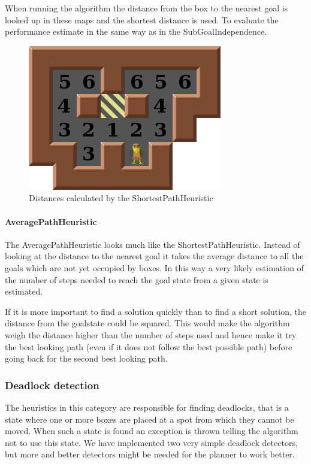 When running the algorithm the distance from the box to the nearest
goal is looked up in these maps and the shortest distance is used. To
evaluate the performance estimate in the same way as in the
SubGoalIndependence.
\begin{figure}[htp]
  \centering
  \includegraphics[scale=0.5]{img/src/shortestpathheuristic.png}
  \caption{Distances calculated by the ShortestPathHeuristic}
  \label{fig:shortestpathheuristic}
\end{figure}

\paragraph{AveragePathHeuristic}The AveragePathHeuristic looks much
like the ShortestPathHeuristic. Instead of looking at the distance to
the nearest goal it takes the average distance to all the goals which
are not yet occupied by boxes. In this way a very likely estimation of
the number of steps needed to reach the goal state from a given state
is estimated.

If it is more important to find a solution quickly than to find a
short solution, the distance from the goalstate could be squared. This
would make the algorithm weigh the distance higher than the number of
steps used and hence make it try the best looking path (even if it
does not follow the best possible path) before going back for the
second best looking path.

\subsubsection{Deadlock detection}
The heuristics in this category are responsible for finding deadlocks,
that is a state where one or more boxes are placed at a spot from
which they cannot be moved. When such a state is found an exception is
thrown telling the \astar algorithm not to use this state. We have
implemented two very simple deadlock detectors, but more and better
detectors might be needed for the planner to work better.
